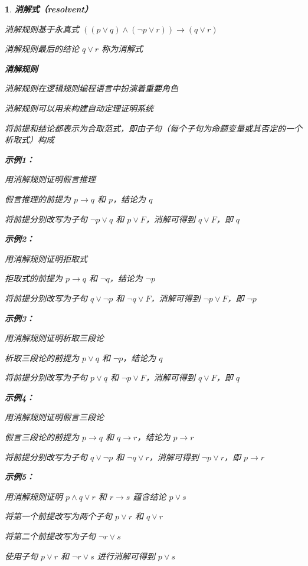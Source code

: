 \documentclass[UTF8]{report}
\theoremstyle{MyLineTheoremStyle} %
\theoremstyle{MyBlockTheoremStyle} %
\theoremstyle{MySubsubsectionStyle} %
\newtheorem{definition}{}
\begin{document}
\begin{definition}
    \textbf{消解式（resolvent）}\par
    消解规则基于永真式 $((p \lor q) \land (\neg p \lor r)) \rightarrow (q \lor r)$\par
    消解规则最后的结论 $q \lor r$ 称为消解式\par

    \textbf{消解规则}\par
    消解规则在逻辑规则编程语言中扮演着重要角色\par
    消解规则可以用来构建自动定理证明系统\par
    将前提和结论都表示为合取范式，即由子句（每个子句为命题变量或其否定的一个析取式）构成\par

    \textbf{示例1：}\par
    用消解规则证明假言推理\par
    假言推理的前提为 $p \rightarrow q$ 和 $p$，结论为 $q$\par
    将前提分别改写为子句 $\neg p \lor q$ 和 $p \lor F$，消解可得到 $q \lor F$，即 $q$\par

    \textbf{示例2：}\par
    用消解规则证明拒取式\par
    拒取式的前提为 $p \rightarrow q$ 和 $\neg q$，结论为 $\neg p$\par
    将前提分别改写为子句 $q \lor \neg p$ 和 $\neg q \lor F$，消解可得到 $\neg p \lor F$，即 $\neg p$\par

    \textbf{示例3：}\par
    用消解规则证明析取三段论\par
    析取三段论的前提为 $p \lor q$ 和 $\neg p$，结论为 $q$\par
    将前提分别改写为子句 $p \lor q$ 和 $\neg p \lor F$，消解可得到 $q \lor F$，即 $q$\par

    \textbf{示例4：}\par
    用消解规则证明假言三段论\par
    假言三段论的前提为 $p \rightarrow q$ 和 $q \rightarrow r$，结论为 $p \rightarrow r$\par
    将前提分别改写为子句 $q \lor \neg p$ 和 $\neg q \lor r$，消解可得到 $\neg p \lor r$，即 $p \rightarrow r$\par

    \textbf{示例5：}\par
    用消解规则证明 $p \land q \lor r$ 和 $r \rightarrow s$ 蕴含结论 $p \lor s$\par
    将第一个前提改写为两个子句 $p \lor r$ 和 $q \lor r$\par
    将第二个前提改写为子句 $\neg r \lor s$\par
    使用子句 $p \lor r$ 和 $\neg r \lor s$ 进行消解可得到 $p \lor s$\par
\end{definition}
\end{document}
